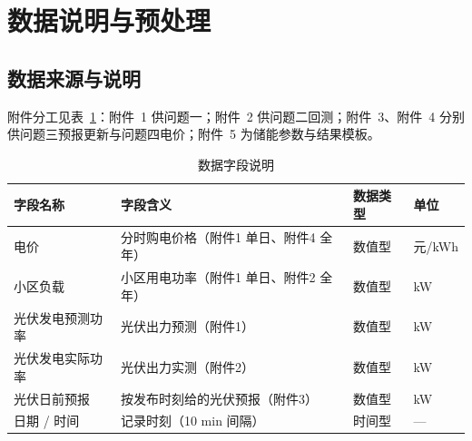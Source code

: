 \section{数据说明与预处理}

\subsection{数据来源与说明}

附件分工见表~\ref{tab:fields}：附件~1 供问题一；附件~2 供问题二回测；附件~3、附件~4 分别供问题三预报更新与问题四电价；附件~5 为储能参数与结果模板。

\begin{table}[htbp]
  \centering
  \small
  \caption{数据字段说明}
  \label{tab:fields}

  \begingroup


  \renewcommand{\arraystretch}{1.15}
  \setlength{\tabcolsep}{6pt}

  \begin{tabular}{llll}
    \toprule

    \rowcolor{headerblue}
    字段名称 & 字段含义 & 数据类型 & 单位 \\

    \midrule

    电价
    & 分时购电价格（附件1 单日、附件4 全年）
    & 数值型 & 元/kWh \\

    \rowcolor{rowblue}
    小区负载
    & 小区用电功率（附件1 单日、附件2 全年）
    & 数值型 & kW \\

    光伏发电预测功率
    & 光伏出力预测（附件1）
    & 数值型 & kW \\

    \rowcolor{rowblue}
    光伏发电实际功率
    & 光伏出力实测（附件2）
    & 数值型 & kW \\

    光伏日前预报
    & 按发布时刻给的光伏预报（附件3）
    & 数值型 & kW \\

    \rowcolor{rowblue}
    日期 / 时间
    & 记录时刻（10 min 间隔）
    & 时间型 & — \\

    \bottomrule
  \end{tabular}

  \endgroup
\end{table}


